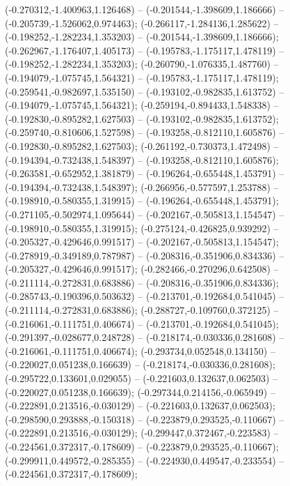  (-0.270312,-1.400963,1.126468) -- (-0.201544,-1.398609,1.186666) -- (-0.205739,-1.526062,0.974463);
 (-0.266117,-1.284136,1.285622) -- (-0.198252,-1.282234,1.353203) -- (-0.201544,-1.398609,1.186666);
 (-0.262967,-1.176407,1.405173) -- (-0.195783,-1.175117,1.478119) -- (-0.198252,-1.282234,1.353203);
 (-0.260790,-1.076335,1.487760) -- (-0.194079,-1.075745,1.564321) -- (-0.195783,-1.175117,1.478119);
 (-0.259541,-0.982697,1.535150) -- (-0.193102,-0.982835,1.613752) -- (-0.194079,-1.075745,1.564321);
 (-0.259194,-0.894433,1.548338) -- (-0.192830,-0.895282,1.627503) -- (-0.193102,-0.982835,1.613752);
 (-0.259740,-0.810606,1.527598) -- (-0.193258,-0.812110,1.605876) -- (-0.192830,-0.895282,1.627503);
 (-0.261192,-0.730373,1.472498) -- (-0.194394,-0.732438,1.548397) -- (-0.193258,-0.812110,1.605876);
 (-0.263581,-0.652952,1.381879) -- (-0.196264,-0.655448,1.453791) -- (-0.194394,-0.732438,1.548397);
 (-0.266956,-0.577597,1.253788) -- (-0.198910,-0.580355,1.319915) -- (-0.196264,-0.655448,1.453791);
 (-0.271105,-0.502974,1.095644) -- (-0.202167,-0.505813,1.154547) -- (-0.198910,-0.580355,1.319915);
 (-0.275124,-0.426825,0.939292) -- (-0.205327,-0.429646,0.991517) -- (-0.202167,-0.505813,1.154547);
 (-0.278919,-0.349189,0.787987) -- (-0.208316,-0.351906,0.834336) -- (-0.205327,-0.429646,0.991517);
 (-0.282466,-0.270296,0.642508) -- (-0.211114,-0.272831,0.683886) -- (-0.208316,-0.351906,0.834336);
 (-0.285743,-0.190396,0.503632) -- (-0.213701,-0.192684,0.541045) -- (-0.211114,-0.272831,0.683886);
 (-0.288727,-0.109760,0.372125) -- (-0.216061,-0.111751,0.406674) -- (-0.213701,-0.192684,0.541045);
 (-0.291397,-0.028677,0.248728) -- (-0.218174,-0.030336,0.281608) -- (-0.216061,-0.111751,0.406674);
 (-0.293734,0.052548,0.134150) -- (-0.220027,0.051238,0.166639) -- (-0.218174,-0.030336,0.281608);
 (-0.295722,0.133601,0.029055) -- (-0.221603,0.132637,0.062503) -- (-0.220027,0.051238,0.166639);
 (-0.297344,0.214156,-0.065949) -- (-0.222891,0.213516,-0.030129) -- (-0.221603,0.132637,0.062503);
 (-0.298590,0.293888,-0.150318) -- (-0.223879,0.293525,-0.110667) -- (-0.222891,0.213516,-0.030129);
 (-0.299447,0.372467,-0.223583) -- (-0.224561,0.372317,-0.178609) -- (-0.223879,0.293525,-0.110667);
 (-0.299911,0.449572,-0.285355) -- (-0.224930,0.449547,-0.233554) -- (-0.224561,0.372317,-0.178609);
